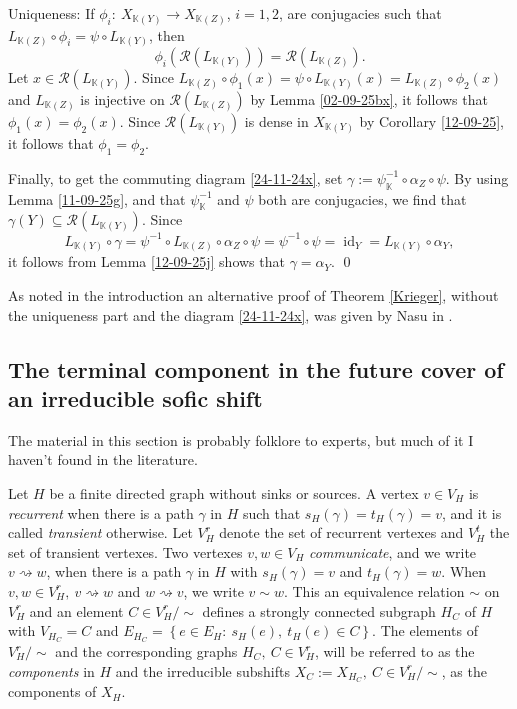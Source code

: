 \documentclass[12pt,oneside,english]{amsart}
\newcommand{\id}{\operatorname{id}}
\begin{document}
Uniqueness: If $\phi_i : \ X_{\mathbb K(Y)} \to  X_{\mathbb K(Z)}$, $i =1,2$, are conjugacies such that $L_{\mathbb K(Z)} \circ \phi_i = \psi \circ L_{\mathbb K(Y)}$, then
$$
\phi_i\left(\mathcal R(L_{\mathbb K(Y)})\right) = \mathcal R(L_{\mathbb K(Z)}).
$$
Let $x \in \mathcal R(L_{\mathbb K(Y)})$. Since $L_{\mathbb K(Z)} \circ \phi_1(x) = \psi \circ L_{\mathbb K(Y)}(x) = L_{\mathbb K(Z)} \circ \phi_2(x)$ and $L_{\mathbb K(Z)}$ is injective on $\mathcal R(L_{\mathbb K(Z)})$ by Lemma \ref{02-09-25bx}, it follows that $\phi_1(x) = \phi_2(x)$. Since $\mathcal R(L_{\mathbb K(Y)})$ is dense in $X_{\mathbb K(Y)}$ by Corollary \ref{12-09-25}, it follows that $\phi_1 = \phi_2$.

Finally, to get the commuting diagram \eqref{24-11-24x}, set $\gamma:= \psi_\mathbb K^{-1} \circ \alpha_{Z} \circ \psi$. By using Lemma \ref{11-09-25g}, and that $\psi_\mathbb K^{-1}$ and $\psi$ both are conjugacies, we find that $\gamma(Y) \subseteq \mathcal R(L_{\mathbb K(Y)})$. Since
$$
L_{\mathbb K(Y)}\circ \gamma = \psi^{-1} \circ L_{\mathbb K(Z)} \circ \alpha_{Z} \circ \psi = \psi^{-1} \circ \psi = \id_Y = L_{\mathbb K(Y)} \circ \alpha_Y ,
$$
it follows from Lemma \ref{12-09-25j} shows that $\gamma = \alpha_Y$. \qed


As noted in the introduction an alternative proof of Theorem \ref{Krieger}, without the uniqueness part and the diagram \eqref{24-11-24x}, was given by Nasu in \cite{N}.

\subsection{The terminal component in the future cover of an irreducible sofic shift}

The material in this section is probably folklore to experts, but much of it I haven't found in the literature.

Let $H$ be a finite directed graph without sinks or sources. A vertex $v \in V_H$ is \emph{recurrent} when there is a path $\gamma$ in $H$ such that $s_H(\gamma) = t_H(\gamma) = v$, and it is called \emph{transient} otherwise. Let $V^r_H$ denote the set of recurrent vertexes and $V^t_H$ the set of transient vertexes. Two vertexes $v,w \in V_H$ \emph{communicate}, and we write $v \rightsquigarrow w$, when there is a path $\gamma$ in $H$ with $s_H(\gamma) = v$ and $t_H(\gamma) = w$. When $v,w \in V_H^r, \  v \rightsquigarrow w$ and $w \rightsquigarrow v$, we write $v \sim w$. This an equivalence relation $\sim$ on $V_H^r$ and an element $C \in V_H^r/\sim$ defines a strongly connected subgraph $H_C$ of $H$ with $V_{H_C} = C$ and $E_{H_C} = \left\{e \in E_H: \ s_H(e), \ t_H(e) \in C\right\}$. The elements of $ V_H^r/\sim$ and the corresponding graphs $H_C, \ C \in V_H^r$, will be referred to as the \emph{components} in $H$ and the irreducible subshifts $X_C := X_{H_C}, \ C \in V_H^r/\sim$, as the components of $X_H$.
 
\end{document}
